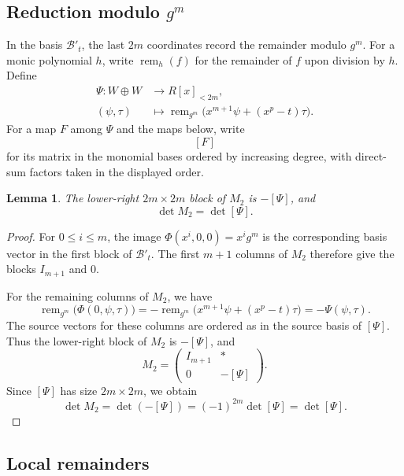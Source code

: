 \documentclass{amsart}
\newtheorem{lemma}[theorem]{Lemma}
\numberwithin{equation}{section}
\begin{document}
\subsection{Reduction modulo \texorpdfstring{$g^m$}{g to the m}}
\label{subsec_remainder-map}

In the basis $\mathcal B'_t$, the last $2m$ coordinates
record the remainder modulo $g^m$. For a monic polynomial
$h$, write $\operatorname{rem}_h(f)$ for the remainder
of $f$ upon division by $h$. Define
\[
  \begin{aligned}
    \Psi\colon W\oplus W&\longrightarrow R[x]_{<2m},\\
    (\psi,\tau)&\longmapsto
      \operatorname{rem}_{g^m}\bigl(x^{m+1}\psi+(x^p-t)\tau\bigr).
  \end{aligned}
\]
For a map $F$ among $\Psi$ and the maps below, write
\[[F]\]
for its matrix in the monomial bases ordered by increasing degree, with
direct-sum factors taken in the displayed order.

\begin{lemma}\label{lem_det-S}
The lower-right $2m\times 2m$ block of $M_2$ is
$-[\Psi]$, and
\[
  \det M_2=\det[\Psi].
\]
\end{lemma}

\begin{proof}
For $0\le i\le m$, the image
$\Phi(x^i,0,0)=x^ig^m$ is the corresponding basis vector
in the first block of $\mathcal B'_t$. The first $m+1$
columns of $M_2$ therefore give the blocks $I_{m+1}$
and $0$.

For the remaining columns of $M_2$, we have
\[
  \operatorname{rem}_{g^m}\bigl(\Phi(0,\psi,\tau)\bigr)
    =-\operatorname{rem}_{g^m}
      \bigl(x^{m+1}\psi+(x^p-t)\tau\bigr)
    =-\Psi(\psi,\tau).
\]
The source vectors for these columns are ordered as in
the source basis of $[\Psi]$. Thus the lower-right block
of $M_2$ is $-[\Psi]$, and
\[
  M_2=
  \begin{pmatrix}
    I_{m+1} & *\\
    0 & -[\Psi]
  \end{pmatrix}.
\]
Since $[\Psi]$ has size $2m\times 2m$, we obtain
\begin{equation}\label{eq_b-s}
  \det M_2=\det(-[\Psi])=(-1)^{2m}\det[\Psi]=\det[\Psi].
\end{equation}
\end{proof}

\subsection{Local remainders}
\label{subsec_local-remainders}
\end{document}
